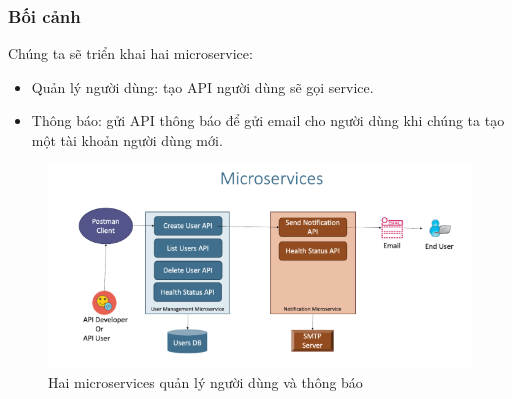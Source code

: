 \subsubsection{Bối cảnh}
Chúng ta sẽ triển khai hai microservice:
\begin{itemize}
    \item Quản lý người dùng: tạo API người dùng sẽ gọi service.
    \item Thông báo: gửi API thông báo để gửi email cho người dùng khi chúng ta tạo một tài khoản người dùng mới.
\end{itemize}
\begin{figure}[H]
    \begin{center}
    \includegraphics[scale=1]{images/hieu/chap-2/microservice.png}
    \vspace*{5mm}
    \caption{Hai microservices quản lý người dùng và thông báo}
    \end{center}
\end{figure}

